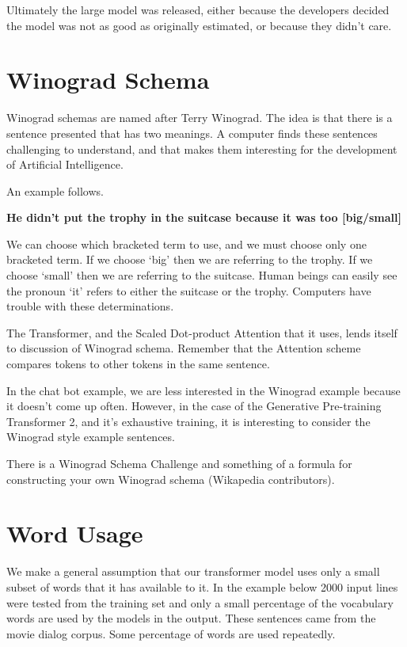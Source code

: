 Ultimately the large model was released, either because the developers decided the model was not as good as originally estimated, or because they didn't care. 

\section{Winograd Schema}

Winograd schemas are named after Terry Winograd. The idea is that there is a sentence presented that has two meanings. A computer finds these sentences challenging to understand, and that makes them interesting for the development of Artificial Intelligence.

An example follows.

\begin{center}
	\textbf{He didn't put the trophy in the suitcase because it was too [big/small]}
\end{center}

We can choose which bracketed term to use, and we must choose only one bracketed term. If we choose `big' then we are referring to the trophy. If we choose `small' then we are referring to the suitcase. Human beings can easily see the pronoun `it' refers to either the suitcase or the trophy. Computers have trouble with these determinations.

The Transformer, and the Scaled Dot-product Attention that it uses, lends itself to discussion of Winograd schema. Remember that the Attention scheme compares tokens to other tokens in the same sentence. 

In the chat bot example, we are less interested in the Winograd example because it doesn't come up often. However, in the case of the Generative Pre-training Transformer 2, and it's exhaustive training, it is interesting to consider the Winograd style example sentences.

There is a Winograd Schema Challenge and something of a formula for constructing your own Winograd schema (Wikapedia contributors). \cite{wiki:xxx}

\section{Word Usage}

We make a general assumption that our transformer model uses only a small subset of words that it has available to it. In the example below 2000 input lines were tested from the training set and only a small percentage of the vocabulary words are used by the models in the output. These sentences came from the movie dialog corpus. Some percentage of words are used repeatedly.

